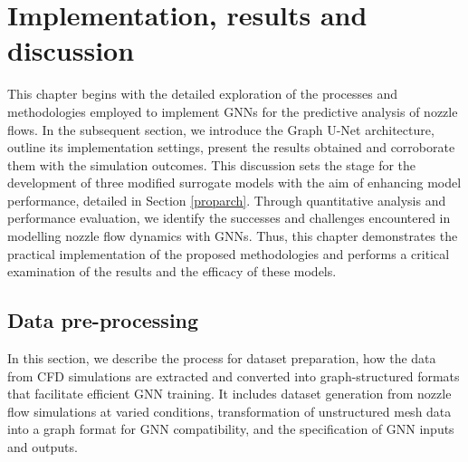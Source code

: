 \chapter{Implementation, results and discussion}
\label{chap:Method}
This chapter begins with the detailed exploration of the processes and methodologies employed to implement GNNs for the predictive analysis of nozzle flows. In the subsequent section, we introduce the Graph U-Net architecture, outline its implementation settings, present the results obtained and corroborate them with the simulation outcomes. This discussion sets the stage for the development of three modified surrogate models with the aim of enhancing model performance, detailed in Section \ref{proparch}. Through quantitative analysis and performance evaluation, we identify the successes and challenges encountered in modelling nozzle flow dynamics with GNNs. Thus, this chapter demonstrates the practical implementation of the proposed methodologies and performs a critical examination of the results and the efficacy of these models.
\section{Data pre-processing} \label{prep}
In this section, we describe the process for dataset preparation, how the data from CFD simulations are extracted and converted into graph-structured formats that facilitate efficient GNN training. It includes dataset generation from nozzle flow simulations at varied conditions, transformation of unstructured mesh data into a graph format for GNN compatibility, and the specification of GNN inputs and outputs. 
